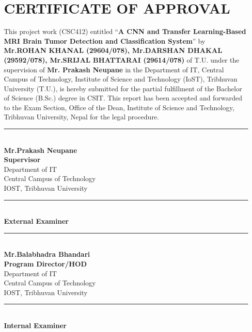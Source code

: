 \section*{\centering \Large \textbf{CERTIFICATE OF APPROVAL}}

This project work (CSC412) entitled ``{\bf A CNN and Transfer Learning-Based
MRI Brain Tumor Detection and Classification System}'' by {\bf Mr\@.\@ ROHAN
        KHANAL (29604/078), Mr\@.\@ DARSHAN DHAKAL (29592/078), Mr\@.\@ SRIJAL
        BHATTARAI (29614/078)} of T.U\@. under the supervision of {\bf Mr\@. Prakash Neupane}
in the Department of IT, Central Campus of Technology, Institute of Science
and Technology (IoST), Tribhuvan University (T.U\@.), is hereby submitted for
the partial fulfillment of the Bachelor of Science (B.Sc\@.) degree in CSIT\@.
This report has been accepted and forwarded to the Exam Section, Office of the
Dean, Institute of Science and Technology, Tribhuvan University, Nepal for the
legal procedure.\\[2em]

\noindent
\begin{minipage}[t]{0.45\textwidth}
    \centering
    \rule{5cm}{0.4pt} \\
    \textbf{Mr.\@ Prakash Neupane} \\
    {\bf Supervisor}\\
    Department of IT\\
    Central Campus of Technology\\
    IOST, Tribhuvan University\\[3em]

    \rule{4cm}{0.4pt} \\
    \textbf{External Examiner} \\
\end{minipage}
\hfill
\begin{minipage}[t]{0.45\textwidth}
    \centering
    \rule{6cm}{0.4pt} \\
    \textbf{Mr.\@ Balabhadra Bhandari} \\
    {\bf Program Director/HOD}\\
    Department of IT\\
    Central Campus of Technology\\
    IOST, Tribhuvan University\\[3em]

    \rule{4cm}{0.4pt} \\
    \textbf{Internal Examiner} \\
\end{minipage}

\newpage
